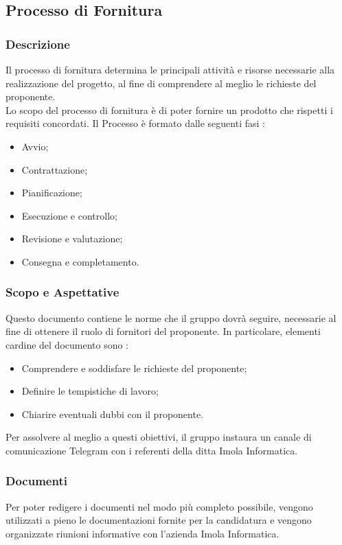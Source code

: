 
\subsection{Processo di Fornitura}
	
	\subsubsection{Descrizione}
		Il processo di fornitura determina le principali attività e risorse necessarie alla realizzazione del progetto, al fine di comprendere al meglio le richieste del proponente.\\
		Lo scopo del processo di fornitura è di poter fornire un prodotto che rispetti i requisiti concordati. Il Processo è formato dalle seguenti fasi : 
		\begin{itemize}
			\item Avvio;
			\item Contrattazione;
			\item Pianificazione;
			\item Esecuzione e controllo;
			\item Revisione e valutazione;
			\item Consegna e completamento.
		\end{itemize}
	
	\subsubsection{Scopo e Aspettative}
		Questo documento contiene le norme che il gruppo dovrà seguire, necessarie al fine di ottenere il ruolo di fornitori del proponente. In particolare, elementi cardine del documento sono : 
		\begin{itemize}
			\item Comprendere e soddisfare le richieste del proponente;
			\item Definire le tempistiche di lavoro;
			\item Chiarire eventuali dubbi con il proponente.
		\end{itemize}
		Per assolvere al meglio a questi obiettivi, il gruppo instaura un canale di comunicazione Telegram con i referenti della ditta Imola Informatica.
	
	\subsubsection{Documenti}
		
		Per poter redigere i documenti nel modo più completo possibile, vengono utilizzati a pieno le documentazioni fornite per la candidatura e vengono organizzate riunioni informative con l'azienda Imola Informatica.
		
